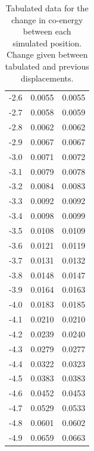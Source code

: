 \documentclass[a4paper]{IEEEtran}
\begin{document}
\begin{table}[ht]
\begin{tabular}{@{}ccc@{}}
            -2.6                  & 0.0055 & 0.0055 \\
            -2.7                  & 0.0058 & 0.0059 \\
            -2.8                  & 0.0062 & 0.0062 \\
            -2.9                  & 0.0067 & 0.0067 \\
            -3.0                  & 0.0071 & 0.0072 \\
            -3.1                  & 0.0079 & 0.0078 \\
            -3.2                  & 0.0084 & 0.0083 \\
            -3.3                  & 0.0092 & 0.0092 \\
            -3.4                  & 0.0098 & 0.0099 \\
            -3.5                  & 0.0108 & 0.0109 \\
            -3.6                  & 0.0121 & 0.0119 \\
            -3.7                  & 0.0131 & 0.0132 \\
            -3.8                  & 0.0148 & 0.0147 \\
            -3.9                  & 0.0164 & 0.0163 \\
            -4.0                  & 0.0183 & 0.0185 \\
            -4.1                  & 0.0210 & 0.0210 \\
            -4.2                  & 0.0239 & 0.0240 \\
            -4.3                  & 0.0279 & 0.0277 \\
            -4.4                  & 0.0322 & 0.0323 \\
            -4.5                  & 0.0383 & 0.0383 \\
            -4.6                  & 0.0452 & 0.0453 \\
            -4.7                  & 0.0529 & 0.0533 \\
            -4.8                  & 0.0601 & 0.0602 \\
            -4.9                  & 0.0659 & 0.0663 \\ \bottomrule   
        \end{tabular}
        \caption{Tabulated data for the change in co-energy between each simulated position. Change given between tabulated and previous displacements.}
        \label{coenergy}
    \end{table}
\end{document}
